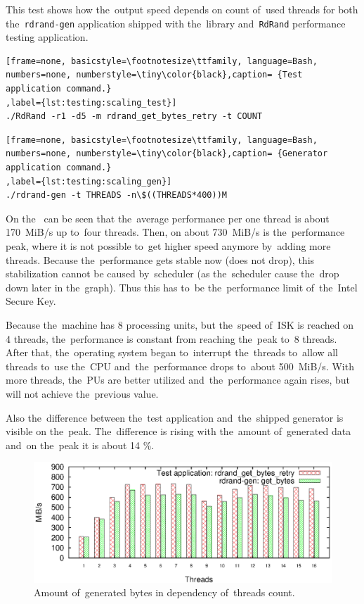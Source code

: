 \par{
This test shows how the~output speed depends on count of~used threads for both the~{\tt rdrand-gen} application shipped with the~library and~{\tt RdRand} performance testing application. 
}

\begin{lstlisting}[frame=none, basicstyle=\footnotesize\ttfamily, language=Bash, numbers=none, numberstyle=\tiny\color{black},caption= {Test application command.}
,label={lst:testing:scaling_test}]
./RdRand -r1 -d5 -m rdrand_get_bytes_retry -t COUNT 
\end{lstlisting}

\begin{lstlisting}[frame=none, basicstyle=\footnotesize\ttfamily, language=Bash, numbers=none, numberstyle=\tiny\color{black},caption= {Generator application command.}
,label={lst:testing:scaling_gen}]
./rdrand-gen -t THREADS -n\$((THREADS*400))M
\end{lstlisting}

\par{
On the~ can be seen that the~average performance per one thread is about 170~MiB/s up to~four threads. Then, on about 730~MiB/s is the~performance peak, where it is not possible to~get higher speed anymore by~adding more threads. Because the~performance gets stable now (does not drop), this stabilization cannot be caused by~scheduler (as the~scheduler cause the~drop down later in the~graph). Thus this has to~be the~performance limit of~the~Intel Secure Key. 
}

\par{
Because the~machine has 8 processing units, but the~speed of~ISK is reached on 4 threads, the~performance is constant from reaching the~peak to~8 threads. After that, the~operating system began to~interrupt the~threads to~allow all threads to~use the~CPU and~the~performance drops to~about 500~MiB/s. With more threads, the~PUs are better utilized and~the~performance again rises, but will not achieve the~previous value.
}

\par{
Also the~difference between the~test application and~the~shipped generator is visible on the~peak. The~difference is rising with the~amount of~generated data and~on the~peak it is about 14 \%.
}

\begin{figure}[h!]
  \centering
 \includegraphics[width=15cm]{fig/tests/scaling.eps} %
\caption{Amount of~generated bytes in dependency of~threads count.}
\label{fig:testing:threadsScalability}
\end{figure}

